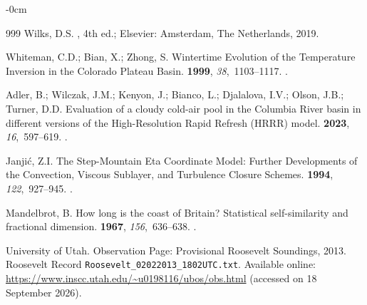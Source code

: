 \documentclass[air,article,accept,moreauthors]{Definitions/mdpi}
\begin{document}
\begin{adjustwidth}{-\extralength}{0cm}
\begin{thebibliography}{999}
Wilks, D.S.
, 4th ed.; Elsevier: Amsterdam, The Netherlands,  2019.

Whiteman, C.D.; Bian, X.; Zhong, S.
\newblock Wintertime Evolution of the Temperature Inversion in the {Colorado Plateau Basin}.
 {\bf 1999}, {\em 38},~1103--1117.
.

Adler, B.; Wilczak, J.M.; Kenyon, J.; Bianco, L.; Djalalova, I.V.; Olson, J.B.; Turner, D.D.
\newblock Evaluation of a cloudy cold-air pool in the {Columbia River} basin in different versions of the {High-Resolution Rapid Refresh (HRRR)} model.
 {\bf 2023}, {\em 16},~597--619.
.

Janji{\'c}, Z.I.
\newblock The Step-Mountain {Eta} Coordinate Model: Further Developments of the Convection, Viscous Sublayer, and Turbulence Closure Schemes.
 {\bf 1994}, {\em 122},~927--945.
.

Mandelbrot, B.
\newblock How long is the coast of {Britain?} {Statistical} self-similarity and fractional dimension.
 {\bf 1967}, {\em 156},~636--638.
.

{University of Utah}.
 Observation Page: Provisional {Roosevelt} Soundings, 2013. Roosevelt Record \texttt{Roosevelt\_02022013\_1802UTC.txt}.
Available online:
\newblock \url{https://www.inscc.utah.edu/~u0198116/ubos/obs.html} (accessed on 18 September 2026).


\end{thebibliography}

\PublishersNote{}
\end{adjustwidth}
\end{document}
